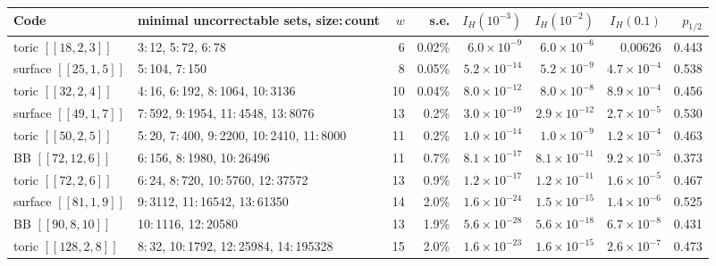 \setlength{\tabcolsep}{4pt}
\begin{tabular}{@{}lp{}rrrrrr@{}}
\toprule
Code & minimal uncorrectable sets, size:\,count & $w$ & s.e. & $I_H(10^{-3})$ & $I_H(10^{-2})$ & $I_H(0.1)$ & $p_{1/2}$\\
\midrule
toric $[[18,2,3]]$ & 3:\,12, 5:\,72, 6:\,78 & 6 & 0.02\% & $6.0\times10^{-9}$ & $6.0\times10^{-6}$ & $0.00626$ & 0.443\\
surface $[[25,1,5]]$ & 5:\,104, 7:\,150 & 8 & 0.05\% & $5.2\times10^{-14}$ & $5.2\times10^{-9}$ & $4.7\times10^{-4}$ & 0.538\\
toric $[[32,2,4]]$ & 4:\,16, 6:\,192, 8:\,1064, 10:\,3136 & 10 & 0.04\% & $8.0\times10^{-12}$ & $8.0\times10^{-8}$ & $8.9\times10^{-4}$ & 0.456\\
surface $[[49,1,7]]$ & 7:\,592, 9:\,1954, 11:\,4548, 13:\,8076 & 13 & 0.2\% & $3.0\times10^{-19}$ & $2.9\times10^{-12}$ & $2.7\times10^{-5}$ & 0.530\\
toric $[[50,2,5]]$ & 5:\,20, 7:\,400, 9:\,2200, 10:\,2410, 11:\,8000 & 11 & 0.2\% & $1.0\times10^{-14}$ & $1.0\times10^{-9}$ & $1.2\times10^{-4}$ & 0.463\\
BB $[[72,12,6]]$ & 6:\,156, 8:\,1980, 10:\,26496 & 11 & 0.7\% & $8.1\times10^{-17}$ & $8.1\times10^{-11}$ & $9.2\times10^{-5}$ & 0.373\\
toric $[[72,2,6]]$ & 6:\,24, 8:\,720, 10:\,5760, 12:\,37572 & 13 & 0.9\% & $1.2\times10^{-17}$ & $1.2\times10^{-11}$ & $1.6\times10^{-5}$ & 0.467\\
surface $[[81,1,9]]$ & 9:\,3112, 11:\,16542, 13:\,61350 & 14 & 2.0\% & $1.6\times10^{-24}$ & $1.5\times10^{-15}$ & $1.4\times10^{-6}$ & 0.525\\
BB $[[90,8,10]]$ & 10:\,1116, 12:\,20580 & 13 & 1.9\% & $5.6\times10^{-28}$ & $5.6\times10^{-18}$ & $6.7\times10^{-8}$ & 0.431\\
toric $[[128,2,8]]$ & 8:\,32, 10:\,1792, 12:\,25984, 14:\,195328 & 15 & 2.0\% & $1.6\times10^{-23}$ & $1.6\times10^{-15}$ & $2.6\times10^{-7}$ & 0.473\\
\bottomrule
\end{tabular}
